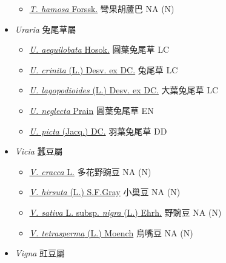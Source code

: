 \begin{itemize}
  \begin{itemize}
        \item[] \href{http://www.theplantlist.org/tpl1.1/search?q=Trigonella+hamosa}{\textit{T. hamosa} Forssk.}   彎果胡蘆巴   NA (N)
  \end{itemize}
 \item[] \textit{Uraria} 兔尾草屬
                                
  \begin{itemize}
        \item[] \href{http://www.theplantlist.org/tpl1.1/search?q=Uraria+aequilobata}{\textit{U. aequilobata} Hosok.}   圓葉兔尾草   LC
        \item[] \href{http://www.theplantlist.org/tpl1.1/search?q=Uraria+crinita}{\textit{U. crinita} (L.) Desv. ex DC.}   兔尾草   LC
        \item[] \href{http://www.theplantlist.org/tpl1.1/search?q=Uraria+lagopodioides}{\textit{U. lagopodioides} (L.) Desv. ex DC.}   大葉兔尾草   LC
        \item[] \href{http://www.theplantlist.org/tpl1.1/search?q=Uraria+neglecta}{\textit{U. neglecta} Prain}   圓葉兔尾草   EN
        \item[] \href{http://www.theplantlist.org/tpl1.1/search?q=Uraria+picta}{\textit{U. picta} (Jacq.) DC.}   羽葉兔尾草   DD
  \end{itemize}
 \item[] \textit{Vicia} 蠶豆屬
                                
  \begin{itemize}
        \item[] \href{http://www.theplantlist.org/tpl1.1/search?q=Vicia+cracca}{\textit{V. cracca} L.}   多花野豌豆   NA (N)
        \item[] \href{http://www.theplantlist.org/tpl1.1/search?q=Vicia+hirsuta}{\textit{V. hirsuta} (L.) S.F.Gray}   小巢豆   NA (N)
        \item[] \href{http://www.theplantlist.org/tpl1.1/search?q=Vicia+sativa+subsp.+nigra}{\textit{V. sativa} L. subsp. \textit{nigra} (L.) Ehrh.}   野豌豆   NA (N)
        \item[] \href{http://www.theplantlist.org/tpl1.1/search?q=Vicia+tetrasperma}{\textit{V. tetrasperma} (L.) Moench}   烏嘴豆   NA (N)
  \end{itemize}
 \item[] \textit{Vigna} 豇豆屬
                                

\end{itemize}
